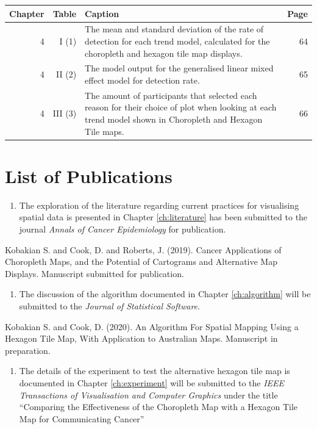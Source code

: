 \documentclass{monashthesis}
\begin{document}
\begin{tabular}{rr>{\raggedright\arraybackslash}p{25em}r}
\toprule
Chapter & Table & Caption & Page\\
\midrule
4 & I (1) & The mean and standard deviation of the rate of detection for each trend model, calculated for the choropleth and hexagon tile map displays. & 64\\
4 & II (2) & The model output for the generalised linear mixed effect model for detection rate. & 65\\
4 & III (3) & The amount of participants that selected each reason for their choice of plot when looking at each trend model shown in Choropleth and Hexagon Tile maps. & 66\\
\bottomrule
\end{tabular}

\hypertarget{list-of-publications}{%
\chapter*{List of Publications}\label{list-of-publications}}

\begin{enumerate}
\def\labelenumi{\arabic{enumi}.}
\tightlist
\item
  The exploration of the literature regarding current practices for visualising spatial data is presented in Chapter \ref{ch:literature} has been submitted to the journal \emph{Annals of Cancer Epidemiology} for publication.
\end{enumerate}

Kobakian S. and Cook, D. and Roberts, J. (2019). Cancer Applications of Choropleth Maps, and the Potential of Cartograms and Alternative Map Displays. Manuscript submitted for publication.

\begin{enumerate}
\def\labelenumi{\arabic{enumi}.}
\setcounter{enumi}{1}
\tightlist
\item
  The discussion of the algorithm documented in Chapter \ref{ch:algorithm} will be submitted to the \emph{Journal of Statistical Software}.
\end{enumerate}

Kobakian S. and Cook, D. (2020). An Algorithm For Spatial Mapping Using a Hexagon Tile Map, With Application to Australian Maps. Manuscript in preparation.

\begin{enumerate}
\def\labelenumi{\arabic{enumi}.}
\setcounter{enumi}{2}
\tightlist
\item
  The details of the experiment to test the alternative hexagon tile map is documented in Chapter \ref{ch:experiment} will be submitted to the \emph{IEEE Transactions of Visualisation and Computer Graphics} under the title ``Comparing the Effectiveness of the Choropleth Map with a Hexagon Tile Map for Communicating Cancer''
\end{enumerate}
\end{document}
